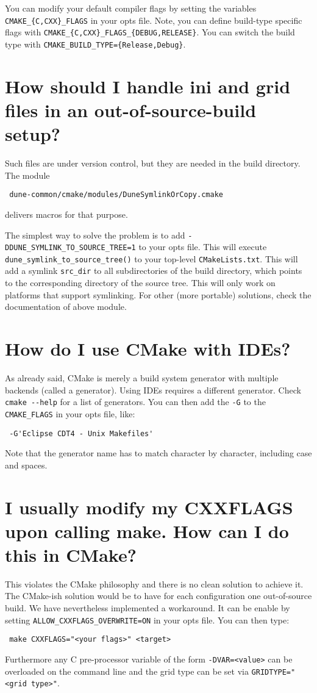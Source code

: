 \documentclass[a4paper,10pt,DIV9,headings=small]{scrartcl}
\begin{document}
You can modify your default compiler flags by setting the variables
\lstinline!CMAKE_{C,CXX}_FLAGS! in your opts file. Note, you can define build-type specific
flags with \lstinline!CMAKE_{C,CXX}_FLAGS_{DEBUG,RELEASE}!. You can switch the build type
with \lstinline!CMAKE_BUILD_TYPE={Release,Debug}!.

\section{How should I handle ini and grid files in an out-of-source-build setup?}
\label{inifiles}
Such files are under version control, but they are needed in the build directory. The module
\begin{lstlisting}
 dune-common/cmake/modules/DuneSymlinkOrCopy.cmake
\end{lstlisting}
delivers macros for that purpose.

The simplest way to solve the problem is to add  \verb!-DDUNE_SYMLINK_TO_SOURCE_TREE=1! to your opts file. This will execute \lstinline!dune_symlink_to_source_tree()! to your top-level \lstinline!CMakeLists.txt!. This will add a symlink \lstinline!src_dir! to all subdirectories of the build directory, which points to the corresponding directory of the source tree. This will only work on platforms that support symlinking. For other (more portable) solutions, check the documentation of above module.

\section{How do I use CMake with IDEs?}
\label{ides}
As already said, CMake is merely a build system generator with multiple backends (called a generator). Using IDEs requires a different generator. Check \lstinline!cmake --help! for a list of generators. You can then add the \lstinline!-G! to the \verb!CMAKE_FLAGS! in your opts file, like:
\begin{lstlisting}
 -G'Eclipse CDT4 - Unix Makefiles'
\end{lstlisting}
Note that the generator name has to match character by character, including case and spaces.

\section{I usually modify my CXXFLAGS upon calling make. How can I do this in CMake?}
\label{cxxflags}
This violates the CMake philosophy and there is no clean solution to achieve it. The CMake-ish solution would be
to have for each configuration one out-of-source build. We have nevertheless implemented a workaround. It can be enable
by setting \lstinline!ALLOW_CXXFLAGS_OVERWRITE=ON! in your opts file. You can then type:
\begin{lstlisting}
 make CXXFLAGS="<your flags>" <target>
\end{lstlisting}
Furthermore any C pre-processor variable of the form \lstinline!-DVAR=<value>! can be overloaded on the command line
and the grid type can be set via \lstinline!GRIDTYPE="<grid type>"!.
\end{document}

